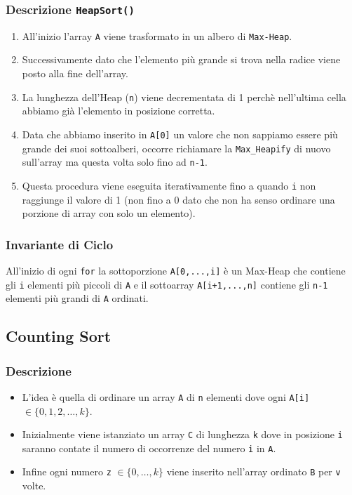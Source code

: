 \documentclass{article}
\begin{document}
\cprotect\subsubsection{Descrizione \verb|HeapSort()|}

\begin{enumerate}
    \item All'inizio l'array \verb|A| viene trasformato in un albero di \verb|Max-Heap|.
    \item Successivamente dato che l'elemento più grande si trova nella radice viene posto alla fine dell'array.
    \item La lunghezza dell'Heap (\verb|n|) viene decrementata di 1 perchè nell'ultima cella abbiamo già l'elemento in posizione corretta.
    \item Data che abbiamo inserito in \verb|A[0]| un valore che non sappiamo essere più grande dei suoi sottoalberi, occorre richiamare la \verb|Max_Heapify| di nuovo sull'array ma questa volta solo fino ad \verb|n-1|.
    \item Questa procedura viene eseguita iterativamente fino a quando \verb|i| non raggiunge il valore di 1 (non fino a 0 dato che non ha senso ordinare una porzione di array con solo un elemento).
\end{enumerate}

\subsubsection{Invariante di Ciclo}

All'inizio di ogni \verb|for| la sottoporzione \verb|A[0,...,i]| è un Max-Heap che contiene gli \verb|i| elementi più piccoli di \verb|A| e il sottoarray \verb|A[i+1,...,n]| contiene gli \verb|n-1| elementi più grandi di \verb|A| ordinati.



\subsection{Counting Sort}

\subsubsection{Descrizione}

\begin{itemize}
    \item L'idea è quella di ordinare un array \verb|A| di \verb|n| elementi dove ogni \verb|A[i]| $\in \{0, 1, 2, \dots, k\}$.
    \item Inizialmente viene istanziato un array \verb|C| di lunghezza \verb|k| dove in posizione \verb|i| saranno contate il numero di occorrenze del numero \verb|i| in \verb|A|.
    \item Infine ogni numero \verb|z| $\in \{0, \dots, k\}$ viene inserito nell'array ordinato \verb|B| per \verb|v| volte.
\end{itemize}
\end{document}
